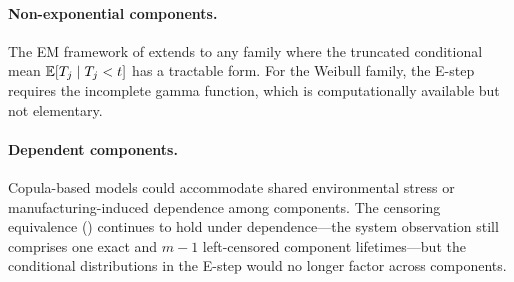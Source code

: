 \paragraph{Non-exponential components.}
The EM framework of  extends to any family where
the truncated conditional mean $\mathbb{E}[T_j \mid T_j < t]$ has a tractable
form.  For the Weibull family, the E-step requires the incomplete gamma
function, which is computationally available but not elementary.

\paragraph{Dependent components.}
Copula-based models could accommodate shared environmental stress or
manufacturing-induced dependence among components.  The censoring
equivalence () continues to hold under
dependence---the system observation still comprises one exact and
$m-1$ left-censored component lifetimes---but the conditional
distributions in the E-step would no longer factor across components.
